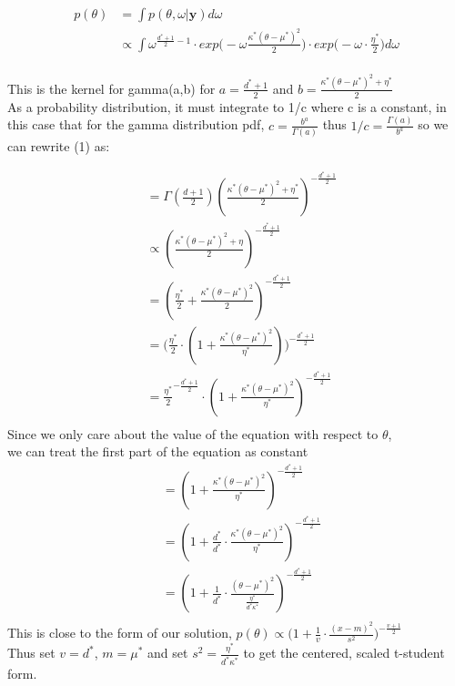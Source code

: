 \documentclass{homework}
\begin{document}
\begin{enumerate}[label=(\Alph*)]
\begin{equation} \begin{split}
p(\theta) & = \int p(\theta, \omega | \textbf{y}) d\omega \\
& \propto \int  \omega^{\frac{d^*+1}{2} - 1 } \cdot exp\big( -\omega \frac{\kappa^*(\theta - \mu^*)^2}{2} \big)  \cdot exp\big( -\omega \cdot \frac{\eta^*}{2}\big) d\omega \\
\end{split} \end{equation}

This is the kernel for gamma(a,b) for $a = \frac{d^* + 1}{2}$ and $b = \frac{\kappa^*(\theta - \mu^*)^2 + \eta^*}{2} $\\ As a probability distribution, it must integrate to 1/c where c is a constant, in this case that for the gamma distribution pdf, $c = \frac{b^a}{\Gamma(a)}$ thus $1/c  =   \frac{\Gamma(a)}{b^a}$ so we can rewrite (1) as:

\begin{equation} \begin{split}
& = \Gamma(\frac{d+1}{2})( \frac{\kappa^*(\theta - \mu^*)^2 + \eta^*}{2} )^{-\frac{d^*+1}{2}} \\
& \propto ( \frac{\kappa^*(\theta - \mu^*)^2 + \eta}{2} )^{-\frac{d^*+1}{2}} \\
& = ( \frac{\eta^*}{2} + \frac{\kappa^*(\theta - \mu^*)^2}{2} )^{-\frac{d^*+1}{2}} \\
& = \big(\frac{\eta^*}{2} \cdot ( 1 + \frac{\kappa^*(\theta - \mu^*)^2}{\eta^*}) \big)^{-\frac{d^*+1}{2}} \\
& = \frac{\eta^*}{2}^{-\frac{d^*+1}{2}} \cdot ( 1 + \frac{\kappa^*(\theta - \mu^*)^2}{\eta^*})^{-\frac{d^*+1}{2}} \\
\end{split} \end{equation}
Since we only care about the value of the equation with respect to $\theta$, \\we can treat the first part of the equation as constant
\begin{equation} \begin{split}
& = ( 1 + \frac{\kappa^*(\theta - \mu^*)^2}{\eta^*})^{-\frac{d^*+1}{2}} \\
& = ( 1 + \frac{d^*}{d^*} \cdot \frac{\kappa^*(\theta - \mu^*)^2}{\eta^*})^{-\frac{d^*+1}{2}} \\
& = ( 1 + \frac{1}{d^*} \cdot \frac{(\theta - \mu^*)^2}{\frac{\eta^*}{d^*\kappa^*}})^{-\frac{d^*+1}{2}} \\
\end{split} \end{equation}
This is close to the form of our solution, $p(\theta) \propto \big( 1 + \frac{1}{v} \cdot \frac{(x-m)^2}{s^2}\big)^{-\frac{v+1}{2}}$\\
Thus set $v = d^*$, $m = \mu^*$ and set $s^2 = \frac{\eta^*}{d^*\kappa^*}$ to get the centered, scaled t-student form.



\end{enumerate}
\end{document}
